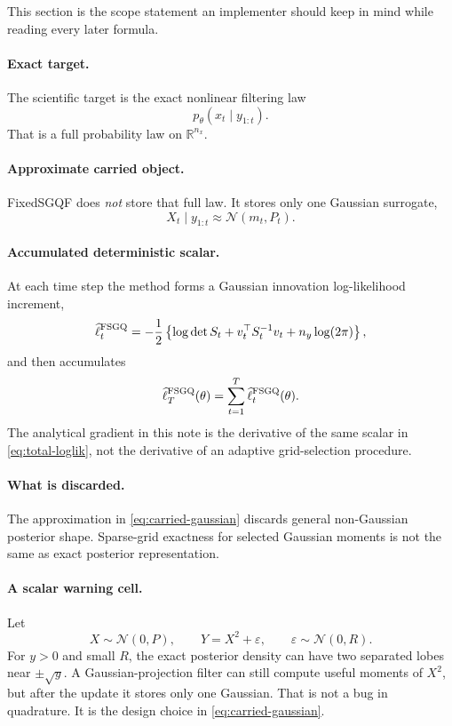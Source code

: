 \documentclass[11pt]{article}
\numberwithin{equation}{section}
\newcommand{\R}{\mathbb R}
\newcommand{\N}{\mathcal N}
\newcommand{\ellhat}{\widehat\ell}
\begin{document}
This section is the scope statement an implementer should keep in mind while
reading every later formula.

\paragraph{Exact target.}
The scientific target is the exact nonlinear filtering law
\begin{equation}
  p_\theta(x_t\mid y_{1:t}).
  \label{eq:exact-filtering-law}
\end{equation}
That is a full probability law on \(\R^{n_x}\).

\paragraph{Approximate carried object.}
FixedSGQF does \emph{not} store that full law.  It stores only one Gaussian
surrogate,
\begin{equation}
  X_t\mid y_{1:t}
  \approx
  \N(m_t,P_t).
  \label{eq:carried-gaussian}
\end{equation}

\paragraph{Accumulated deterministic scalar.}
At each time step the method forms a Gaussian innovation log-likelihood
increment,
\begin{equation}
  \ellhat_t^{\rm FSGQ}
  =
  -\frac12\left\{\log\det S_t + v_t^\top S_t^{-1}v_t + n_y\log(2\pi)\right\},
  \label{eq:increment-loglik}
\end{equation}
and then accumulates
\begin{equation}
  \ellhat_T^{\rm FSGQ}(\theta)=\sum_{t=1}^T \ellhat_t^{\rm FSGQ}(\theta).
  \label{eq:total-loglik}
\end{equation}
The analytical gradient in this note is the derivative of the same scalar in
\eqref{eq:total-loglik}, not the derivative of an adaptive grid-selection
procedure.

\paragraph{What is discarded.}
The approximation in \eqref{eq:carried-gaussian} discards general non-Gaussian
posterior shape.  Sparse-grid exactness for selected Gaussian moments is not the
same as exact posterior representation.

\paragraph{A scalar warning cell.}
Let
\begin{equation}
  X\sim\N(0,P),
  \qquad
  Y=X^2+\varepsilon,
  \qquad
  \varepsilon\sim\N(0,R).
  \label{eq:quadratic-cell}
\end{equation}
For \(y>0\) and small \(R\), the exact posterior density can have two separated
lobes near \(\pm\sqrt y\).  A Gaussian-projection filter can still compute useful
moments of \(X^2\), but after the update it stores only one Gaussian.  That is
not a bug in quadrature.  It is the design choice in
\eqref{eq:carried-gaussian}.
\end{document}
